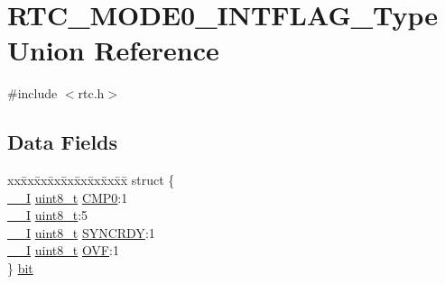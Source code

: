 \hypertarget{union_r_t_c___m_o_d_e0___i_n_t_f_l_a_g___type}{}\section{R\+T\+C\+\_\+\+M\+O\+D\+E0\+\_\+\+I\+N\+T\+F\+L\+A\+G\+\_\+\+Type Union Reference}
\label{union_r_t_c___m_o_d_e0___i_n_t_f_l_a_g___type}


{\ttfamily \#include $<$rtc.\+h$>$}

\subsection*{Data Fields}
\begin{DoxyCompactItemize}
\item 
\begin{tabbing}
xx\=xx\=xx\=xx\=xx\=xx\=xx\=xx\=xx\=\kill
struct \{\\
\>\mbox{\hyperlink{core__cm0plus_8h_af63697ed9952cc71e1225efe205f6cd3}{\_\_I}} \mbox{\hyperlink{union_r_t_c___m_o_d_e0___i_n_t_f_l_a_g___type_a5b4208c6f4c4a4290c4f2804d1eb1d5b}{uint8\_t}} \mbox{\hyperlink{union_r_t_c___m_o_d_e0___i_n_t_f_l_a_g___type_acfad8789de2381db309db911557f4563}{CMP0}}:1\\
\>\mbox{\hyperlink{core__cm0plus_8h_af63697ed9952cc71e1225efe205f6cd3}{\_\_I}} \mbox{\hyperlink{union_r_t_c___m_o_d_e0___i_n_t_f_l_a_g___type_a5b4208c6f4c4a4290c4f2804d1eb1d5b}{uint8\_t}}:5\\
\>\mbox{\hyperlink{core__cm0plus_8h_af63697ed9952cc71e1225efe205f6cd3}{\_\_I}} \mbox{\hyperlink{union_r_t_c___m_o_d_e0___i_n_t_f_l_a_g___type_a5b4208c6f4c4a4290c4f2804d1eb1d5b}{uint8\_t}} \mbox{\hyperlink{union_r_t_c___m_o_d_e0___i_n_t_f_l_a_g___type_ae8a10cfa0bb63130ae1e8150943d680b}{SYNCRDY}}:1\\
\>\mbox{\hyperlink{core__cm0plus_8h_af63697ed9952cc71e1225efe205f6cd3}{\_\_I}} \mbox{\hyperlink{union_r_t_c___m_o_d_e0___i_n_t_f_l_a_g___type_a5b4208c6f4c4a4290c4f2804d1eb1d5b}{uint8\_t}} \mbox{\hyperlink{union_r_t_c___m_o_d_e0___i_n_t_f_l_a_g___type_a52c588fc013d003e33ea581b20d4ba73}{OVF}}:1\\
\} \mbox{\hyperlink{union_r_t_c___m_o_d_e0___i_n_t_f_l_a_g___type_a90f95dd608a6254c8f26685009f08a99}{bit}}\\


\end{tabbing}
\end{DoxyCompactItemize}
